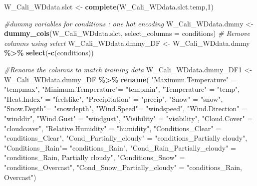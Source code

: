 \documentclass[
]{article}
\newenvironment{Shaded}{\begin{snugshade}}{\end{snugshade}}
\newcommand{\AttributeTok}[1]{\textcolor[rgb]{0.13,0.29,0.53}{#1}}
\newcommand{\CommentTok}[1]{\textcolor[rgb]{0.56,0.35,0.01}{\textit{#1}}}
\newcommand{\DecValTok}[1]{\textcolor[rgb]{0.00,0.00,0.81}{#1}}
\newcommand{\FunctionTok}[1]{\textcolor[rgb]{0.13,0.29,0.53}{\textbf{#1}}}
\newcommand{\NormalTok}[1]{#1}
\newcommand{\OtherTok}[1]{\textcolor[rgb]{0.56,0.35,0.01}{#1}}
\newcommand{\SpecialCharTok}[1]{\textcolor[rgb]{0.81,0.36,0.00}{\textbf{#1}}}
\newcommand{\StringTok}[1]{\textcolor[rgb]{0.31,0.60,0.02}{#1}}
\begin{document}
\begin{Shaded}
\begin{Highlighting}[]
\NormalTok{W\_Cali\_WDdata.slct }\OtherTok{\textless{}{-}} \FunctionTok{complete}\NormalTok{(W\_Cali\_WDdata.slct.temp,}\DecValTok{1}\NormalTok{)}

\CommentTok{\#dummy variables for conditions : one hot encoding}
\NormalTok{W\_Cali\_WDdata.dmmy }\OtherTok{\textless{}{-}} \FunctionTok{dummy\_cols}\NormalTok{(W\_Cali\_WDdata.slct, }
                                         \AttributeTok{select\_columns =} \StringTok{\textquotesingle{}conditions\textquotesingle{}}\NormalTok{)}
\CommentTok{\# Remove columns using select}
\NormalTok{W\_Cali\_WDdata.dmmy\_DF }\OtherTok{\textless{}{-}}\NormalTok{ W\_Cali\_WDdata.dmmy }\SpecialCharTok{\%\textgreater{}\%} 
  \FunctionTok{select}\NormalTok{(}\SpecialCharTok{{-}}\FunctionTok{c}\NormalTok{(conditions))}

\CommentTok{\#Rename the columns to match training data }
\NormalTok{W\_Cali\_WDdata.dmmy\_DF1 }\OtherTok{\textless{}{-}}\NormalTok{ W\_Cali\_WDdata.dmmy\_DF }\SpecialCharTok{\%\textgreater{}\%} 
        \FunctionTok{rename}\NormalTok{( }
          \StringTok{"Maximum.Temperature"} \OtherTok{=} \StringTok{"tempmax"}\NormalTok{,}
          \StringTok{"Minimum.Temperature"}\OtherTok{=} \StringTok{"tempmin"}\NormalTok{,}
          \StringTok{"Temperature"} \OtherTok{=} \StringTok{"temp"}\NormalTok{,}
          \StringTok{"Heat.Index"} \OtherTok{=} \StringTok{"feelslike"}\NormalTok{,}
          \StringTok{"Precipitation"} \OtherTok{=} \StringTok{"precip"}\NormalTok{,}
          \StringTok{"Snow"} \OtherTok{=} \StringTok{"snow"}\NormalTok{,}
          \StringTok{"Snow.Depth"}\OtherTok{=} \StringTok{"snowdepth"}\NormalTok{,}
          \StringTok{"Wind.Speed"}\OtherTok{=} \StringTok{"windspeed"}\NormalTok{,}
          \StringTok{"Wind.Direction"} \OtherTok{=} \StringTok{"winddir"}\NormalTok{,}
          \StringTok{"Wind.Gust"} \OtherTok{=} \StringTok{"windgust"}\NormalTok{,}
          \StringTok{"Visibility"} \OtherTok{=} \StringTok{"visibility"}\NormalTok{,}
          \StringTok{"Cloud.Cover"} \OtherTok{=} \StringTok{"cloudcover"}\NormalTok{,}
          \StringTok{"Relative.Humidity"} \OtherTok{=} \StringTok{"humidity"}\NormalTok{,}
          \StringTok{"Conditions\_Clear"} \OtherTok{=} \StringTok{"conditions\_Clear"}\NormalTok{,}
          \StringTok{"Cond\_Partially\_cloudy"} \OtherTok{=} \StringTok{"conditions\_Partially cloudy"}\NormalTok{,}
          \StringTok{"Conditions\_Rain"}\OtherTok{=} \StringTok{"conditions\_Rain"}\NormalTok{,}
          \StringTok{"Cond\_Rain\_Partially\_cloudy"} \OtherTok{=} \StringTok{"conditions\_Rain, Partially cloudy"}\NormalTok{,}
          \StringTok{"Conditions\_Snow"} \OtherTok{=} \StringTok{"conditions\_Overcast"}\NormalTok{,}
          \StringTok{"Cond\_Snow\_Partially\_cloudy"} \OtherTok{=} \StringTok{"conditions\_Rain, Overcast"}\NormalTok{)}
\end{Highlighting}
\end{Shaded}
\end{document}
